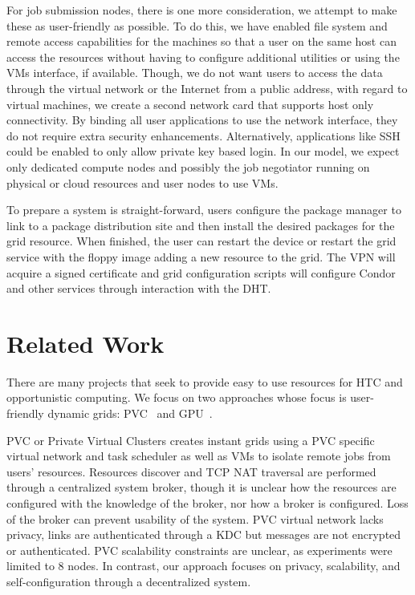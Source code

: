 \documentclass{sig-alternate}
\begin{document}
For job submission nodes, there is one more consideration, we attempt to make
these as user-friendly as possible.  To do this, we have enabled file system
and remote access capabilities for the machines so that a user on the same
host can access the resources without having to configure additional utilities
or using the VMs interface, if available.  Though, we do not want users to
access the data through the virtual network or the Internet from a public
address, with regard to virtual machines, we create a second network card that
supports host only connectivity.  By binding all user applications to use the
network interface, they do not require extra security enhancements.
Alternatively, applications like SSH could be enabled to only allow private key
based login.  In our model, we expect only dedicated compute nodes and possibly
the job negotiator running on physical or cloud resources and user nodes to
use VMs.

To prepare a system is straight-forward, users configure the package manager to
link to a package distribution site and then install the desired packages for
the grid resource.  When finished, the user can restart the device or restart
the grid service with the floppy image adding a new resource to the grid.  The
VPN will acquire a signed certificate and grid configuration scripts will
configure Condor and other services through interaction with the DHT.

\section{Related Work}
\label{related_work}
There are many projects that seek to provide easy to use resources for HTC
and opportunistic computing.  We focus on two approaches whose focus is
user-friendly dynamic grids: PVC~\cite{pvc} and GPU~\cite{gpu}.

PVC or Private Virtual Clusters creates instant grids using a PVC specific
virtual network and task scheduler as well as VMs to isolate remote jobs from
users' resources.  Resources discover and TCP NAT traversal are performed
through a centralized system broker, though it is unclear how the resources are
configured with the knowledge of the broker, nor how a broker is configured.
Loss of the broker can prevent usability of the system.  PVC virtual network
lacks privacy, links are authenticated through a KDC but messages are not
encrypted or authenticated.  PVC scalability constraints are unclear, as
experiments were limited to 8 nodes.  In contrast, our approach focuses on
privacy, scalability, and self-configuration through a decentralized system.
\end{document}
